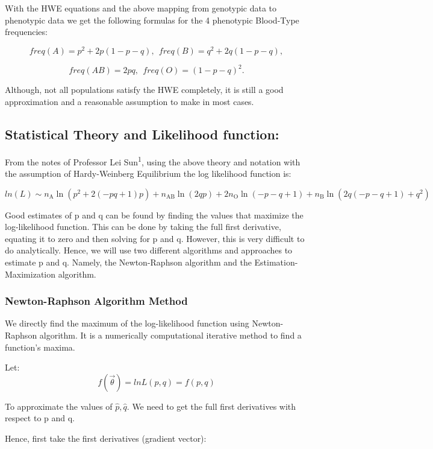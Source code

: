 \documentclass[]{article}
\begin{document}
With the HWE equations and the above mapping from genotypic data to
phenotypic data we get the following formulas for the 4 phenotypic
Blood-Type frequencies:

\[freq(A)=p^2+2p(1-p-q),  \: \:   freq(B)=q^2+2q(1-p-q),\]

\[freq(AB)=2pq,  \: \:   freq(O)=(1-p-q)^2.\]

Although, not all populations satisfy the HWE completely, it is still a
good approximation and a reasonable assumption to make in most cases.

\subsection{Statistical Theory and Likelihood
function:}\label{statistical-theory-and-likelihood-function}

From the notes of Professor Lei Sun\textsuperscript{1}, using the above
theory and notation with the assumption of Hardy-Weinberg Equilibrium
the log likelihood function is:

\[ln(L) \sim n_\text{A}\ln\left(p^2+2\left(-p q+1\right)p\right)+n_\text{AB}\ln\left(2qp\right)+2n_\text{O}\ln\left(-p-q+1\right)+n_\text{B}\ln\left(2q\left(-p-q+1\right)+q^2\right)
\]

Good estimates of p and q can be found by finding the values that
maximize the log-likelihood function. This can be done by taking the
full first derivative, equating it to zero and then solving for p and q.
However, this is very difficult to do analytically. Hence, we will use
two different algorithms and approaches to estimate p and q. Namely, the
Newton-Raphson algorithm and the Estimation-Maximization algorithm.

\subsubsection{Newton-Raphson Algorithm
Method}\label{newton-raphson-algorithm-method}

We directly find the maximum of the log-likelihood function using
Newton-Raphson algorithm. It is a numerically computational iterative
method to find a function's maxima.

Let: \[f(\vec \theta) = lnL(p,q) = f(p,q)\]

To approximate the values of \(\hat{p}, \hat{q}.\) We need to get the
full first derivatives with respect to p and q.

Hence, first take the first derivatives (gradient vector):
\end{document}
